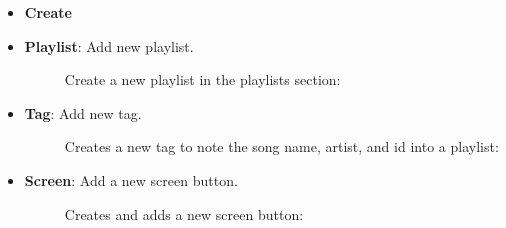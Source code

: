 \documentclass{article}
\begin{document}
\begin{itemize}
    \item[] \textbf{Create} 
    \item \textbf{Playlist}: Add new playlist.
    \begin{description}
        \item[] Create a new playlist in the playlists section:
    \end{description}
    \item \textbf{Tag}: Add new tag.
    \begin{description}
        \item[] Creates a new tag to note the song name, artist, and id into a playlist:
    \end{description}
    \item \textbf{Screen}: Add a new screen button.
    \begin{description}
        \item[] Creates and adds a new screen button:
    \end{description}
\end{itemize}
\end{document}
